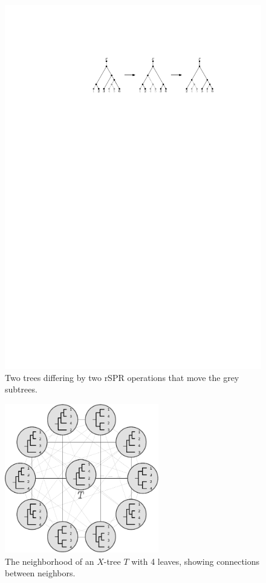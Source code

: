 \documentclass[11pt,onecolumn,conference]{IEEEtran}
\let\MYoriglatexcaption\caption
\renewcommand{\caption}[2][\relax]{\MYoriglatexcaption[#2]{#2}}
\begin{document}
\begin{figure}
	\includegraphics[scale=1.25]{figs/two-spr}
	\caption{Two trees differing by two rSPR operations that move the grey subtrees.}
	\label{fig:two-spr}
\end{figure}

\begin{figure}
	\includegraphics[width=0.6\textwidth]{figs/neighborhood}
	\caption{The neighborhood of an $X$-tree $T$ with 4 leaves, showing connections between neighbors.}
	\label{fig:neighborhood}
\end{figure}
\end{document}
